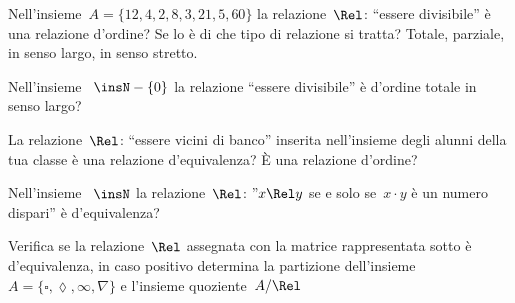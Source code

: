 \begin{esercizio}
\label{ese:B.49}
Nell'insieme~\(A = \{ 12, 4, 2, 8, 3, 21, 5, 60 \}\) la relazione~\(\Rel\): 
``essere divisibile'' è una relazione d'ordine? Se lo è di che tipo di 
relazione si tratta? Totale, parziale, in senso largo, in senso stretto.
\end{esercizio}

\begin{esercizio}
\label{ese:B.50}
Nell'insieme ~\(\insN - \{ 0 \}\) la relazione ``essere divisibile'' è d'ordine 
totale in senso largo?
\end{esercizio}

\begin{esercizio}
\label{ese:B.53}
La relazione~\(\Rel\): ``essere vicini di banco'' inserita nell'insieme degli 
alunni della tua classe è una relazione d'equivalenza? 
È una relazione d'ordine?
\end{esercizio}

\begin{esercizio}
\label{ese:B.55}
Nell'insieme ~\(\insN\) la relazione~\(\Rel\): 
''\(x \Rel y\) se e solo se~\(x \cdot y\) è un numero dispari'' è d'equivalenza?
\end{esercizio}

\begin{esercizio}
\label{ese:B.57}
Verifica se la relazione~\(\Rel\) assegnata con la matrice rappresentata
sotto è d'equivalenza, in caso positivo determina la partizione 
dell'insieme~\(A =\{\square, \lozenge, \infty, \nabla\}\) e l'insieme
quoziente~\(A/\Rel\)
\end{esercizio}

